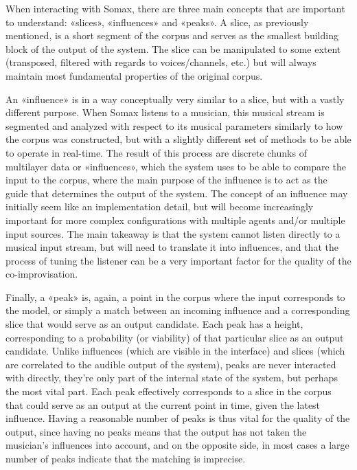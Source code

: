 When interacting with Somax, there are three main concepts that are important to understand: «slices», «influences» and «peaks». A slice, as previously mentioned, is a short segment of the corpus and serves as the smallest building block of the output of the system. The slice can be manipulated to some extent (transposed, filtered with regards to voices/channels, etc.) but will always maintain most fundamental properties of the original corpus. 

An «influence» is in a way conceptually very similar to a slice, but with a vastly different purpose. When Somax listens to a musician, this musical stream is segmented and analyzed with respect to its musical parameters similarly to how the corpus was constructed, but with a slightly different set of methods to be able to operate in real-time. The result of this process are discrete chunks of multilayer data or «influences», which the system uses to be able to compare the input to the corpus, where the main purpose of the influence is to act as the guide that determines the output of the system. The concept of an influence may initially seem like an implementation detail, but will become increasingly important for more complex configurations with multiple agents and/or multiple input sources. The main takeaway is that the system cannot listen directly to a musical input stream, but will need to translate it into influences, and that the process of tuning the listener can be a very important factor for the quality of the co-improvisation.

Finally, a «peak» is, again, a point in the corpus where the input corresponds to the model, or simply a match between an incoming influence and a corresponding slice that would serve as an output candidate. Each peak has a height, corresponding to a probability (or viability) of that particular slice as an output candidate. Unlike influences (which are visible in the interface) and slices (which are correlated to the audible output of the system), peaks are never interacted with directly, they're only part of the internal state of the system, but perhaps the most vital part. Each peak effectively corresponds to a slice in the corpus that could serve as an output at the current point in time, given the latest influence. Having a reasonable number of peaks is thus vital for the quality of the output, since having no peaks means that the output has not taken the musician's influences into account, and on the opposite side, in most cases a large number of peaks indicate that the matching is imprecise. 

